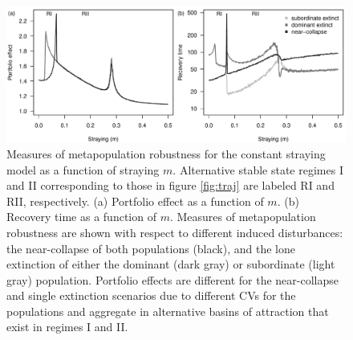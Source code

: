 \documentclass{revtex4}
\begin{document}
\begin{figure}
  \captionsetup{justification=raggedright,
singlelinecheck=false
}
\centering
\includegraphics[width=1\textwidth]{fig_mpert.pdf}
\caption{
Measures of metapopulation robustness for the constant straying model as a function of straying $m$.
Alternative stable state regimes I and II corresponding to those in figure \ref{fig:traj} are labeled RI and RII, respectively.
(a) Portfolio effect as a function of $m$.
(b) Recovery time as a function of $m$.
Measures of metapopulation robustness are shown with respect to different induced disturbances: the near-collapse of both populations (black), and the lone extinction of either the dominant (dark gray) or subordinate (light gray) population.
Portfolio effects are different for the near-collapse and single extinction scenarios due to different CVs for the populations and aggregate in alternative basins of attraction that exist in regimes I and II.
} \label{fig:mpert}
\end{figure}
\end{document}
